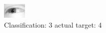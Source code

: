 \begin{figure}[h!]
\begin{center}
\includegraphics[width=0.60\columnwidth]{figures/ID2429_class_3_target_4.png}
\end{center}
\caption{ Classification: 3 actual target: 4}
\label{fig:ID2429_class_3_target_4}
\end{figure}
